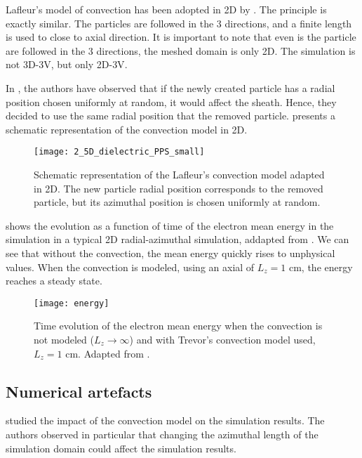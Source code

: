     Lafleur's model of convection has been adopted in \ac{2D} by \citet{croes2017a}.
    The principle is exactly similar.
    The particles are followed in the 3 directions, and a finite length is used to close to axial direction.
    It is important to note that even is the particle are followed in the 3 directions, the meshed domain is only \ac{2D}.
    The simulation is not \ac{3D}-\ac{3V}, but only \ac{2D}-\ac{3V}.

    In \citet{croes2017a}, the authors have observed that if the newly created particle has a radial position chosen uniformly at random, it would affect the sheath.
    Hence, they decided to use the same radial position that the removed particle.
     presents a schematic representation of the convection model in \ac{2D}.

    \begin{figure}[hbtp]
      \centering
      \texttt{[image: 2\_5D\_dielectric\_PPS\_small]}
      \caption{Schematic representation of the Lafleur's convection model adapted in \ac{2D}. The new particle radial position corresponds to the removed particle, but its azimuthal position is chosen uniformly at random. }
      \label{fig-Fake_2d}
    \end{figure}

     shows the evolution as a function of time of the electron mean energy in the simulation in a typical \ac{2D} radial-azimuthal simulation, addapted from \citet{croes2017}.
    We can see that without the convection, the mean energy quickly rises to unphysical values.
    When the convection is modeled, using an axial of $L_z=1$ cm, the energy reaches a steady state.
    \begin{figure}[hbtp]
      \centering
      \texttt{[image: energy]}
      \caption{Time evolution of the electron mean energy when the convection is not modeled ($L_z \rightarrow \infty$) and with Trevor's convection model used, $L_z = 1$ cm. Adapted from \citet{croes2017}.}
      \label{fig-energy_convection}
    \end{figure}



  \subsection{Numerical artefacts}
    \citet{lafleur2016a} studied the impact of the convection model on the simulation results.
    The authors observed in particular that changing the azimuthal length of the simulation domain could affect the simulation results.

